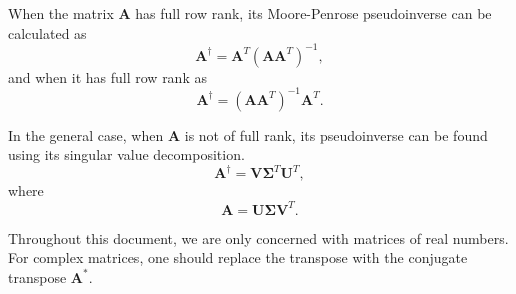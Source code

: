 \documentclass[../main.tex]{subfiles}
\begin{document}
When the matrix $\bm{A}$ has full row rank, its Moore-Penrose pseudoinverse can be calculated as
\begin{equation}
    \bm{A}^{\dagger} = \bm{A}^T (\bm{A}\bm{A}^T)^{-1},
\end{equation}
and when it has full row rank as
\begin{equation}
    \bm{A}^{\dagger} = (\bm{A}\bm{A}^T)^{-1}\bm{A}^T.
\end{equation}

In the general case, when $\bm{A}$ is not of full rank, its pseudoinverse can be found using its singular value decomposition.
\begin{equation}
    \bm{A}^{\dagger} = \bm{V} \bm{\Sigma}^T \bm{U}^T,
\end{equation}
where
\begin{equation}
    \bm{A} = \bm{U \Sigma V}^T.
\end{equation}

\begin{remark}
    Throughout this document, we are only concerned with matrices of real numbers. For complex matrices, one should replace the transpose with the conjugate transpose $\bm{A}^{*}$.
\end{remark}
\end{document}
